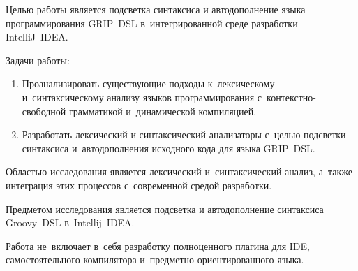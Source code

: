 Целью работы является подсветка синтаксиса и автодополнение языка программирования GRIP~DSL в~интегрированной среде разработки IntelliJ~IDEA.

\newpage

Задачи работы: 
\begin{enumerate} 
	\item{Проанализировать существующие подходы к~лексическому и~синтаксическому анализу языков программирования с~контекстно-свободной грамматикой и~динамической компиляцией.}	
	\item{Разработать лексический и синтаксический анализаторы с~целью подсветки синтаксиса и~автодополнения исходного кода для языка GRIP~DSL.}
\end{enumerate} 

Областью исследования является лексический и~синтаксический анализ, а~также интеграция этих процессов с~современной средой разработки.

Предметом исследования является подсветка и автодополнение синтаксиса Groovy~DSL в~Intellij~IDEA. 

Работа не~включает в~себя разработку полноценного плагина для IDE, самостоятельного компилятора и~предметно-ориентированного языка.


%
